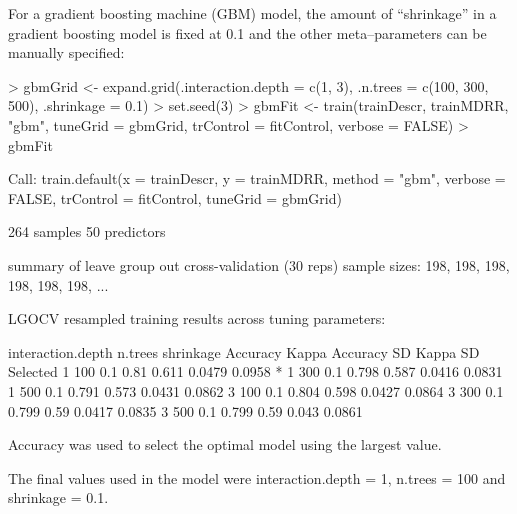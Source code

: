 \documentclass[12pt]{article}
\begin{document}
For a gradient boosting machine (GBM) model, the amount of ``shrinkage'' in a gradient boosting model is fixed at 0.1 and the other meta--parameters can be manually specified:
\pagestyle{plain}
\begin{small}
\begin{landscape}

\begin{Schunk}
\begin{Sinput}
> gbmGrid <-  expand.grid(.interaction.depth = c(1, 3), .n.trees = c(100, 300, 500), .shrinkage = 0.1)
> set.seed(3)
> gbmFit <- train(trainDescr, trainMDRR, "gbm", tuneGrid = gbmGrid, trControl = fitControl, verbose = FALSE)
> gbmFit
\end{Sinput}
\begin{Soutput}
Call:
train.default(x = trainDescr, y = trainMDRR, method = "gbm", 
    verbose = FALSE, trControl = fitControl, tuneGrid = gbmGrid)

264 samples
50 predictors

summary of leave group out cross-validation (30 reps) sample sizes:
    198, 198, 198, 198, 198, 198, ... 

LGOCV resampled training results across tuning parameters:

  interaction.depth  n.trees  shrinkage  Accuracy  Kappa  Accuracy SD  Kappa SD  Selected
  1                  100      0.1        0.81      0.611  0.0479       0.0958    *       
  1                  300      0.1        0.798     0.587  0.0416       0.0831            
  1                  500      0.1        0.791     0.573  0.0431       0.0862            
  3                  100      0.1        0.804     0.598  0.0427       0.0864            
  3                  300      0.1        0.799     0.59   0.0417       0.0835            
  3                  500      0.1        0.799     0.59   0.043        0.0861            

Accuracy was used to select the optimal model using the largest value.

The final values used in the model were interaction.depth = 1, n.trees = 100 and shrinkage = 0.1.
\end{Soutput}
\end{Schunk}

\end{landscape}
\end{small}
\pagestyle{fancy}
\end{document}
